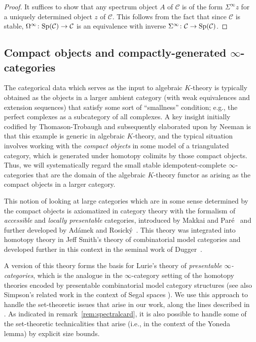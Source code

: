 \documentclass{amsart}
\renewcommand{\to}{\mathchoice{\longrightarrow}{\rightarrow}{\rightarrow}{\rightarrow}}
\let\catsymbfont\mathcal
\newcommand{\aC}{{\catsymbfont{C}}}
\newcommand{\C}{\catsymbfont{C}}
\newcommand{\Spec}{\mathrm{Sp}}%
\renewcommand{\i}{\infty}
\numberwithin{equation}{section}
\theoremstyle{definition}
\begin{document}
\begin{proof}
It suffices to show that any spectrum object $A$ of $\C$ is of the
form $\Sigma^\i z$ for a uniquely determined object $z$ of $\C$.
This follows from the fact that since $\aC$ is stable,
$\Omega^\i \colon \Spec(\C)\to\C$ is an equivalence with inverse
$\Sigma^\infty \colon \C\to\Spec(\C)$.
\end{proof}

\subsection{Compact objects and compactly-generated
$\i$-categories}\label{sec:compact} 

The categorical data which serves as the input to algebraic $K$-theory
is typically obtained as the objects in a larger ambient category
(with weak equivalences and extension sequences) that satisfy some
sort of ``smallness'' condition; e.g., the perfect complexes as a
subcategory of all complexes.  A key insight initially codified by
Thomason-Trobaugh \cite{TT} and subsequently elaborated upon by Neeman
\cite{Neeman} is that this example is generic in algebraic $K$-theory, and the typical
situation involves working with the {\em compact objects} in some
model of a triangulated category, which is generated under homotopy
colimits by those compact objects.  Thus, we will systematically
regard the small stable idempotent-complete $\i$-categories that are
the domain of the algebraic $K$-theory functor as arising as the
compact objects in a larger category.

This notion of looking at large categories which are in some sense
determined by the compact objects is axiomatized in category theory
with the formalism of {\em accessible} and {\em locally presentable}
categories, introduced by Makkai and Par\'{e}~\cite{MakkaiPare} and
further developed by Ad\'{a}mek and Rosick\'{y}~\cite{AdamekRosicky}.
This theory was integrated into homotopy theory in Jeff Smith's theory
of combinatorial model categories and developed further in this
context in the seminal work of Dugger~\cite{Dugger}.

A version of this theory forms the basis for Lurie's theory
of {\em presentable $\i$-categories}, which is the analogue in the
$\i$-category setting of the homotopy theories encoded by presentable
combinatorial model category structures (see also Simpson's related
work in the context of Segal spaces \cite{Simpson}).  We use this
approach to handle the set-theoretic issues that arise in our work,
along the lines described in \cite[1.2.15, 5.4.1]{HTT}.  As indicated
in remark~\ref{rem:spectralcard}, it is also possible to handle some
of the set-theoretic technicalities that arise (i.e., in the context
of the Yoneda lemma) by explicit size bounds.  
\end{document}
